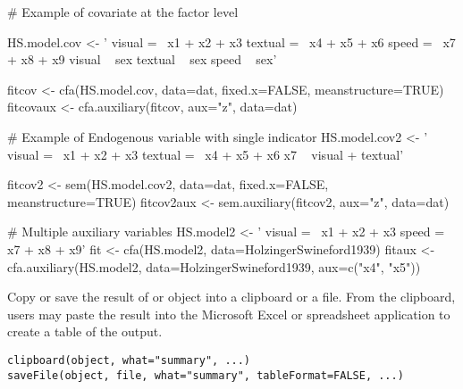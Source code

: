 \documentclass[a4paper]{book}
\begin{document}
\begin{Examples}
\begin{ExampleCode}
# Example of covariate at the factor level

HS.model.cov <- ' visual  =~ x1 + x2 + x3
              textual =~ x4 + x5 + x6
             speed   =~ x7 + x8 + x9 
			  visual ~ sex
			  textual ~ sex
			  speed ~ sex'
	  
fitcov <- cfa(HS.model.cov, data=dat, fixed.x=FALSE, meanstructure=TRUE) 
fitcovaux <- cfa.auxiliary(fitcov, aux="z", data=dat)

# Example of  Endogenous variable with single indicator 
HS.model.cov2 <- ' visual  =~ x1 + x2 + x3
              textual =~ x4 + x5 + x6
              x7 ~ visual + textual'
 	  
fitcov2 <- sem(HS.model.cov2, data=dat, fixed.x=FALSE, meanstructure=TRUE) 
fitcov2aux <- sem.auxiliary(fitcov2, aux="z", data=dat)

# Multiple auxiliary variables
HS.model2 <- ' visual  =~ x1 + x2 + x3
              speed   =~ x7 + x8 + x9'
fit <- cfa(HS.model2, data=HolzingerSwineford1939)
fitaux <- cfa.auxiliary(HS.model2, data=HolzingerSwineford1939, aux=c("x4", "x5")) 
\end{ExampleCode}
\end{Examples}
%
\begin{Description}\relax
Copy or save the result of  or  object into a clipboard or a file. From the clipboard, users may paste the result into the Microsoft Excel or spreadsheet application to create a table of the output.
\end{Description}
%
\begin{Usage}
\begin{verbatim}
clipboard(object, what="summary", ...)
saveFile(object, file, what="summary", tableFormat=FALSE, ...)
\end{verbatim}
\end{Usage}
%
\end{document}
